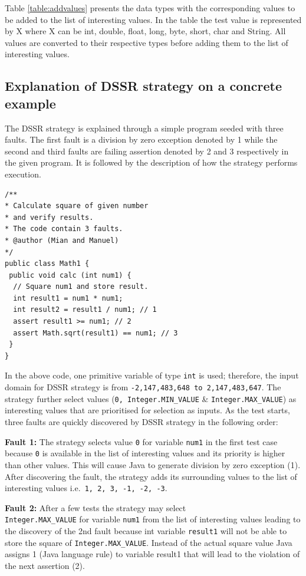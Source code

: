\documentclass[conference]{IEEEtran}
\begin{document}
Table \ref{table:addvalues} presents the data types with the corresponding values to be added to the list of interesting values. In the table the test value is represented by X where X can be int, double, float, long, byte, short, char and String. All values are converted to their respective types before adding them to the list of interesting values.






\subsection{Explanation of DSSR strategy on a concrete example}
The DSSR strategy is explained through a simple program seeded with three faults. The first fault is a division by zero exception denoted by 1 while the second and third faults are failing assertion denoted by 2 and 3 respectively in the given program. It is followed by the description of how the strategy performs execution.

\begin{lstlisting}
/** 
* Calculate square of given number 
* and verify results. 
* The code contain 3 faults.
* @author (Mian and Manuel)
*/
public class Math1 {
 public void calc (int num1) {
  // Square num1 and store result. 
  int result1 = num1 * num1;
  int result2 = result1 / num1; // 1
  assert result1 >= num1; // 2
  assert Math.sqrt(result1) == num1; // 3
 } 
}
\end{lstlisting}
In the above code, one primitive variable of type \verb+int+ is used; therefore, the input domain for DSSR strategy is from \verb+-2,147,483,648 to 2,147,483,647+. The strategy further select values (\verb+0, Integer.MIN_VALUE+ \& \verb+Integer.MAX_VALUE+) as interesting values that are prioritised for selection as inputs. 
As the test starts, three faults are quickly discovered by DSSR strategy in the following order:

\indent \textbf{Fault 1:} The strategy selects value \verb+0+ for variable \verb+num1+  in the first test case because \verb+0+ is available in the list of interesting values and its priority is higher than other values. This will cause Java to generate division by zero exception (1). After discovering the fault, the strategy adds its surrounding values to the list of interesting values i.e.\verb+ 1, 2, 3, -1, -2, -3+. 

\indent \textbf{Fault 2:} After a few tests the strategy may select \\ \verb+Integer.MAX_VALUE+ for variable \verb+num1+  from the list of interesting values leading to the discovery of the 2nd fault because int variable \verb+result1+ will not be able to store the square of \verb+Integer.MAX_VALUE+. Instead of the actual square value Java assigns 1 (Java language rule) to variable result1 that will lead to the violation of the next assertion (2).
\end{document}
